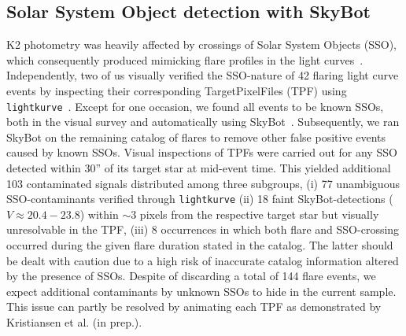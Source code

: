 \documentclass{aa}
\begin{document}
\begin{appendix}
\section{Solar System Object detection with SkyBot}
\label{app:skybot}
K2 photometry was heavily affected by crossings of Solar System Objects (SSO), which consequently produced mimicking flare profiles in the light curves~\citep{szabo2015}. Independently, two of us visually verified the SSO-nature of 42 flaring light curve events by inspecting their corresponding TargetPixelFiles (TPF) using \texttt{lightkurve}~\citep{lightkurve2018}. Except for one occasion, we found all events to be known SSOs, both in the visual survey and automatically using SkyBot~\citep{berthier2016}. Subsequently, we ran SkyBot on the remaining catalog of flares to remove other false positive events caused by known SSOs. Visual inspections of TPFs were carried out for any SSO detected within 30'' of its target star at mid-event time. This yielded additional 103 contaminated signals distributed among three subgroups, (i) 77 unambiguous SSO-contaminants verified through \texttt{lightkurve} (ii) 18 faint SkyBot-detections ($V\approx 20.4-23.8$) within $\sim3$ pixels from the respective target star but visually unresolvable in the TPF, (iii) 8 occurrences in which both flare and SSO-crossing occurred during the given flare duration stated in the catalog. The latter should be dealt with caution due to a high risk of inaccurate catalog information altered by the presence of SSOs. Despite of discarding a total of 144 flare events, we expect additional contaminants by unknown SSOs to hide in the current sample. This issue can partly be resolved by animating each TPF as demonstrated by Kristiansen et al. (in prep.). 

\end{appendix}
\end{document}
